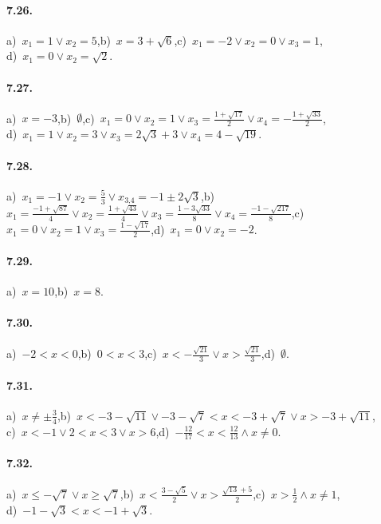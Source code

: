 \paragraph{7.26.} a)~$x_1=1\vee x_2=5$,\quad b)~$x=3+\sqrt 6$,\quad c)~$x_1=-2\vee x_2=0\vee x_3=1$,\protect\\
\quad d)~$x_1=0\vee x_2=\sqrt 2$.

\paragraph{7.27.} a)~$x=-3$,\quad b)~$\emptyset $,\quad c)~$x_1=0\vee x_2=1\vee x_3=\frac{1+\sqrt{17}} 2\vee x_4=-\frac{1+\sqrt{33}} 2$,\protect\\
\quad d)~$x_1=1\vee x_2=3\vee x_3=2\sqrt 3+3\vee x_4=4-\sqrt{19}$.

\paragraph{7.28.} a)~$x_1=-1\vee x_2=\frac 5 3\vee x_{3\text{,}4}=-1\pm 2\sqrt 3$,\quad b)~$x_1=\frac{-1+\sqrt{87}} 4\vee x_2=\frac{1+\sqrt{43}} 4\vee x_3=\frac{1-3\sqrt{33}} 8\vee x_4=\frac{-1-\sqrt{217}} 8$,\quad c)~$x_1=0\vee x_2=1\vee x_3=\frac{1-\sqrt{17}} 2$,\quad d)~$x_1=0\vee x_2=-2$.

\paragraph{7.29.} a)~$x=10$,\quad b)~$x=8$.

\paragraph{7.30.} a)~$ -2<x<0 $,\quad b)~$ 0<x<3 $,\quad c)~$x<-\frac{\sqrt{21}} 3\vee x>\frac{\sqrt{21}} 3$,\quad d)~$\emptyset $.

\paragraph{7.31.} a)~$x\neq \pm \frac 3 4$,\quad b)~$x<-3-\sqrt{11}\vee -3-\sqrt 7<x<-3+\sqrt 7\vee x>-3+\sqrt{11}$,\protect\\
\quad c)~$x<-1\vee 2<x<3\vee x>6$,\quad d)~$-\frac{12}{17}<x<\frac{12}{13}\wedge x\neq 0$.

\paragraph{7.32.} a)~$x\le -\sqrt 7\vee x\ge \sqrt 7$,\quad b)~$x<\frac{3-\sqrt 5} 2\vee x>\frac{\sqrt{13}+5} 2$,\quad c)~$x>\frac 1 2\wedge x\neq 1$,\protect\\
\quad d)~$-1-\sqrt 3<x<-1+\sqrt 3$.

